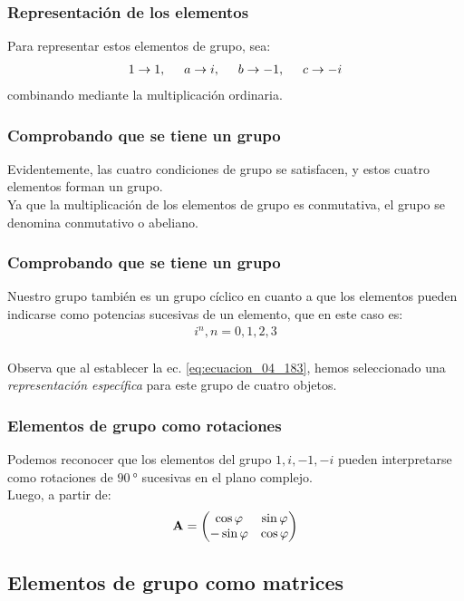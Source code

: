 \documentclass[12pt]{beamer}
\begin{document}
\begin{frame}
\frametitle{Representación de los elementos}
Para representar estos elementos de grupo, sea:
\pause
\begin{align}
1 \to 1, \hspace{0.5cm} a \to i, \hspace{0.5cm} b \to -1, \hspace{0.5cm} c \to -i
\label{eq:ecuacion_04_183}
\end{align}
combinando mediante la multiplicación ordinaria.
\end{frame}
\begin{frame}
\frametitle{Comprobando que se tiene un grupo}
Evidentemente, las cuatro condiciones de grupo se satisfacen, y estos cuatro elementos forman un grupo.
\\
\bigskip
\pause
Ya que la multiplicación de los elementos de grupo es conmutativa, el grupo se denomina \textcolor{deepblue}{conmutativo o abeliano}.
\end{frame}
\begin{frame}
\frametitle{Comprobando que se tiene un grupo}
Nuestro grupo también es un \textcolor{ao}{grupo cíclico} en cuanto a que los elementos pueden indicar­se como potencias sucesivas de un elemento, que en este caso es:
\pause
\begin{align*}
i^{n}, n = 0, 1, 2, 3
\end{align*}
\\
\bigskip
\pause
Observa que al establecer la ec. \ref{eq:ecuacion_04_183}, hemos seleccionado una \emph{representación específica} para este grupo de cuatro objetos.
\end{frame}
\begin{frame}
\frametitle{Elementos de grupo como rotaciones}
Podemos reconocer que los elementos del grupo $1, i, -1, -i$ pueden interpretarse como rotaciones de $\SI{90}{\degree}$ sucesivas en el plano complejo.
\\
\bigskip
\pause
Luego, a partir de:
\pause
\begin{align}
\vb{A} = \mqty(
\cos \varphi & \sin \varphi \\
-\sin \varphi & \cos \varphi )
\end{align}
\end{frame}

\subsection{Elementos de grupo como matrices}
\end{document}

